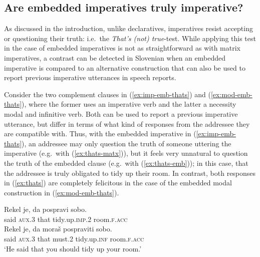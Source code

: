 \documentclass[output=paper,colorlinks,citecolor=brown]{langscibook}
\begin{document}

\subsection{Are embedded imperatives truly imperative?}
\label{subsec:characteristic-semantics}

As discussed in the introduction, unlike declaratives, imperatives resist accepting or questioning their truth: i.e.\ the \emph{That's (not) true}-test. While applying this test in the case of embedded imperatives is not as straightforward as with matrix imperatives, a contrast can be detected in Slovenian when an embedded imperative is compared to an alternative construction that can also be used to report previous imperative utterances in speech reports. 

Consider the two complement clauses in (\ref{ex:imp-emb-thats}) and (\ref{ex:mod-emb-thats}), where the former uses an imperative verb and the latter a necessity modal and infinitive verb. Both can be used to report a previous imperative utterance, but differ in terms of what kind of responses from the addressee they are compatible with. Thus, with the embedded imperative in (\ref{ex:imp-emb-thats}), an addressee may only question the truth of someone uttering the imperative (e.g.\ with (\ref{ex:thats-matx})), but it feels very unnatural to question the truth of the embedded clause (e.g.\ with (\ref{ex:thats-emb})); in this case, that the addressee is truly obligated to tidy up their room. In contrast, both responses in (\ref{ex:thats}) are completely felicitous in the case of the embedded modal construction in (\ref{ex:mod-emb-thats}). 

\ea {}
\ea \label{ex:imp-emb-thats}
\gll Rekel je, da pospravi sobo.\\
     said \textsc{aux.3} that tidy.up.\textsc{imp.2} room.\textsc{f.acc}\\     
\ex \label{ex:mod-emb-thats}
\gll Rekel je, da mora\v{s} pospraviti sobo.\\
     said \textsc{aux.3} that must.\textsc{2} tidy.up.\textsc{inf} room.\textsc{f.acc}\\ 
\glt `He said that you should tidy up your room.'     
\z\z
\end{document}
